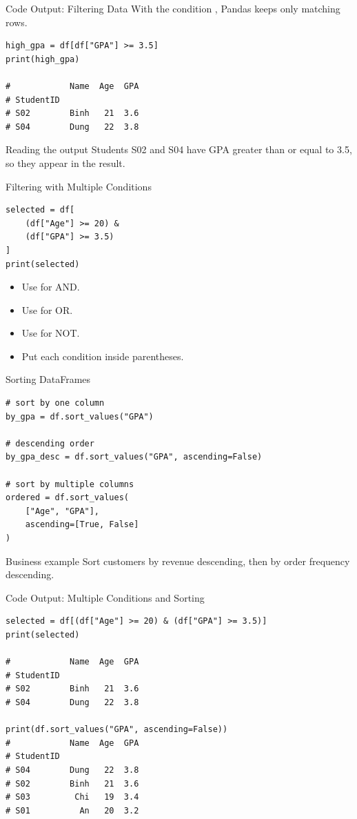 \documentclass[aspectratio=169,11pt]{beamer}
\newcommand{\cmd}[1]{\texttt{\detokenize{#1}}}
\begin{document}
\begin{frame}[fragile]{Code Output: Filtering Data}
\small
With the condition \cmd{GPA >= 3.5}, Pandas keeps only matching rows.
\begin{lstlisting}[style=py]
high_gpa = df[df["GPA"] >= 3.5]
print(high_gpa)

#            Name  Age  GPA
# StudentID                
# S02        Binh   21  3.6
# S04        Dung   22  3.8
\end{lstlisting}
\begin{block}{Reading the output}
Students S02 and S04 have GPA greater than or equal to 3.5, so they appear in the result.
\end{block}
\end{frame}

\begin{frame}[fragile]{Filtering with Multiple Conditions}
\small
\begin{lstlisting}[style=py]
selected = df[
    (df["Age"] >= 20) &
    (df["GPA"] >= 3.5)
]
print(selected)
\end{lstlisting}
\begin{itemize}
  \item Use \cmd{&} for AND.
  \item Use \cmd{|} for OR.
  \item Use \cmd{~} for NOT.
  \item Put each condition inside parentheses.
\end{itemize}
\end{frame}

\begin{frame}[fragile]{Sorting DataFrames}
\small
\begin{lstlisting}[style=py]
# sort by one column
by_gpa = df.sort_values("GPA")

# descending order
by_gpa_desc = df.sort_values("GPA", ascending=False)

# sort by multiple columns
ordered = df.sort_values(
    ["Age", "GPA"],
    ascending=[True, False]
)
\end{lstlisting}
\begin{block}{Business example}
Sort customers by revenue descending, then by order frequency descending.
\end{block}
\end{frame}

\begin{frame}[fragile]{Code Output: Multiple Conditions and Sorting}
\small
\begin{lstlisting}[style=py]
selected = df[(df["Age"] >= 20) & (df["GPA"] >= 3.5)]
print(selected)

#            Name  Age  GPA
# StudentID                
# S02        Binh   21  3.6
# S04        Dung   22  3.8

print(df.sort_values("GPA", ascending=False))
#            Name  Age  GPA
# StudentID                
# S04        Dung   22  3.8
# S02        Binh   21  3.6
# S03         Chi   19  3.4
# S01          An   20  3.2
\end{lstlisting}
\end{frame}
\end{document}
